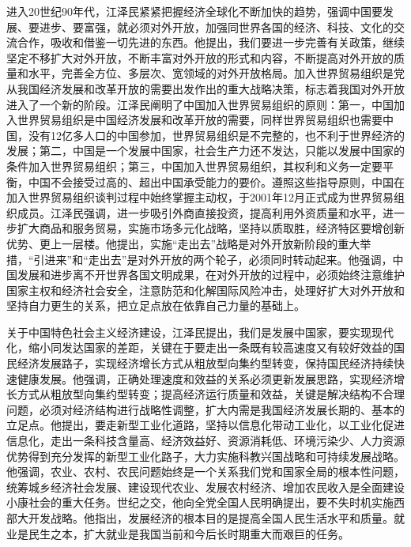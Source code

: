 \documentclass[UTF8, 11pt, oneside]{ctexart}
\begin{document}
进入20世纪90年代，江泽民紧紧把握经济全球化不断加快的趋势，强调中国要发展、要进步、要富强，就必须对外开放，加强同世界各国的经济、科技、文化的交流合作，吸收和借鉴一切先进的东西。他提出，我们要进一步完善有关政策，继续坚定不移扩大对外开放，不断丰富对外开放的形式和内容，不断提高对外开放的质量和水平，完善全方位、多层次、宽领域的对外开放格局。加入世界贸易组织是党从我国经济发展和改革开放的需要出发作出的重大战略决策，标志着我国对外开放进入了一个新的阶段。江泽民阐明了中国加入世界贸易组织的原则：第一，中国加入世界贸易组织是中国经济发展和改革开放的需要，同样世界贸易组织也需要中国，没有12亿多人口的中国参加，世界贸易组织是不完整的，也不利于世界经济的发展；第二，中国是一个发展中国家，社会生产力还不发达，只能以发展中国家的条件加入世界贸易组织；第三，中国加入世界贸易组织，其权利和义务一定要平衡，中国不会接受过高的、超出中国承受能力的要价。遵照这些指导原则，中国在加入世界贸易组织谈判过程中始终掌握主动权，于2001年12月正式成为世界贸易组织成员。江泽民强调，进一步吸引外商直接投资，提高利用外资质量和水平，进一步扩大商品和服务贸易，实施市场多元化战略，坚持以质取胜，经济特区要增创新优势、更上一层楼。他提出，实施“走出去”战略是对外开放新阶段的重大举措，“引进来”和“走出去”是对外开放的两个轮子，必须同时转动起来。他强调，中国发展和进步离不开世界各国文明成果，在对外开放的过程中，必须始终注意维护国家主权和经济社会安全，注意防范和化解国际风险冲击，处理好扩大对外开放和坚持自力更生的关系，把立足点放在依靠自己力量的基础上。

关于中国特色社会主义经济建设，江泽民提出，我们是发展中国家，要实现现代化，缩小同发达国家的差距，关键在于要走出一条既有较高速度又有较好效益的国民经济发展路子，实现经济增长方式从粗放型向集约型转变，保持国民经济持续快速健康发展。他强调，正确处理速度和效益的关系必须更新发展思路，实现经济增长方式从粗放型向集约型转变；提高经济运行质量和效益，关键是解决结构不合理问题，必须对经济结构进行战略性调整，扩大内需是我国经济发展长期的、基本的立足点。他提出，要走新型工业化道路，坚持以信息化带动工业化，以工业化促进信息化，走出一条科技含量高、经济效益好、资源消耗低、环境污染少、人力资源优势得到充分发挥的新型工业化路子，大力实施科教兴国战略和可持续发展战略。他强调，农业、农村、农民问题始终是一个关系我们党和国家全局的根本性问题，统筹城乡经济社会发展、建设现代农业、发展农村经济、增加农民收入是全面建设小康社会的重大任务。世纪之交，他向全党全国人民明确提出，要不失时机实施西部大开发战略。他指出，发展经济的根本目的是提高全国人民生活水平和质量。就业是民生之本，扩大就业是我国当前和今后长时期重大而艰巨的任务。
\end{document}
